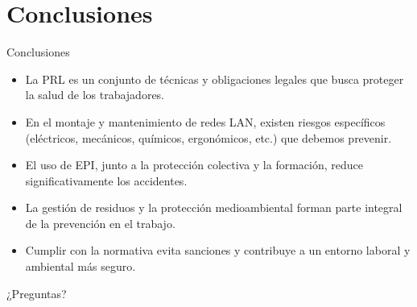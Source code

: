 \documentclass{beamer}
\begin{document}
\section{Conclusiones}

\begin{frame}{Conclusiones}
    \begin{itemize}
        \item La PRL es un conjunto de técnicas y obligaciones legales que busca proteger la salud de los trabajadores.
        \item En el montaje y mantenimiento de redes LAN, existen riesgos específicos (eléctricos, mecánicos, químicos, ergonómicos, etc.) que debemos prevenir.
        \item El uso de EPI, junto a la protección colectiva y la formación, reduce significativamente los accidentes.
        \item La gestión de residuos y la protección medioambiental forman parte integral de la prevención en el trabajo.
        \item Cumplir con la normativa evita sanciones y contribuye a un entorno laboral y ambiental más seguro.
    \end{itemize}
\end{frame}

\begin{frame}
    \centering
    \Huge ¿Preguntas?
\end{frame}
\end{document}
